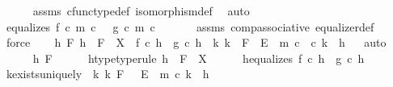 \begin{isabellebody}
\ \ \ \ \isamarkupfalse%
\ assms{\isacharparenleft}{\kern0pt}{}{\isacharcomma}{\kern0pt}{}{\isacharparenright}{\kern0pt}\ cfunc{\isacharunderscore}{\kern0pt}type{\isacharunderscore}{\kern0pt}def\ isomorphism{\isacharunderscore}{\kern0pt}def\ \isamarkupfalse%
\ auto\isanewline
\isanewline
\ \ \isamarkupfalse%
\ equalizes{\isacharcolon}{\kern0pt}\ {\isachardoublequoteopen}f\ {\isasymcirc}\isactrlsub c\ m\ {\isasymcirc}\isactrlsub c\ {\isasymphi}\ {\isacharequal}{\kern0pt}\ g\ {\isasymcirc}\isactrlsub c\ m\ {\isasymcirc}\isactrlsub c\ {\isasymphi}{\isachardoublequoteclose}\isanewline
\ \ \ \ \isamarkupfalse%
\ assms\ comp{\isacharunderscore}{\kern0pt}associative{}\ equalizer{\isacharunderscore}{\kern0pt}def\ \isamarkupfalse%
\ force\isanewline
\ \ \isamarkupfalse%
\ {\isachardoublequoteopen}{\isasymforall}h\ F{\isachardot}{\kern0pt}\ h\ {\isacharcolon}{\kern0pt}\ F\ {\isasymrightarrow}\ X\ {\isasymand}\ f\ {\isasymcirc}\isactrlsub c\ h\ {\isacharequal}{\kern0pt}\ g\ {\isasymcirc}\isactrlsub c\ h\ {\isasymlongrightarrow}\ {\isacharparenleft}{\kern0pt}{\isasymexists}{\isacharbang}{\kern0pt}k{\isachardot}{\kern0pt}\ k\ {\isacharcolon}{\kern0pt}\ F\ {\isasymrightarrow}\ E{\isacharprime}{\kern0pt}\ {\isasymand}\ {\isacharparenleft}{\kern0pt}m\ {\isasymcirc}\isactrlsub c\ {\isasymphi}{\isacharparenright}{\kern0pt}\ {\isasymcirc}\isactrlsub c\ k\ {\isacharequal}{\kern0pt}\ h{\isacharparenright}{\kern0pt}{\isachardoublequoteclose}\isanewline
\ \ \isamarkupfalse%
{\isacharparenleft}{\kern0pt}auto{\isacharparenright}{\kern0pt}\isanewline
\ \ \ \ \isamarkupfalse%
\ h\ F\isanewline
\ \ \ \ \isamarkupfalse%
\ h{\isacharunderscore}{\kern0pt}type{\isacharbrackleft}{\kern0pt}type{\isacharunderscore}{\kern0pt}rule{\isacharbrackright}{\kern0pt}{\isacharcolon}{\kern0pt}\ {\isachardoublequoteopen}h\ {\isacharcolon}{\kern0pt}\ F\ {\isasymrightarrow}\ X{\isachardoublequoteclose}\isanewline
\ \ \ \ \isamarkupfalse%
\ h{\isacharunderscore}{\kern0pt}equalizes{\isacharcolon}{\kern0pt}\ {\isachardoublequoteopen}f\ {\isasymcirc}\isactrlsub c\ h\ {\isacharequal}{\kern0pt}\ g\ {\isasymcirc}\isactrlsub c\ h{\isachardoublequoteclose}\isanewline
\ \ \ \ \isamarkupfalse%
\ k{\isacharunderscore}{\kern0pt}exists{\isacharunderscore}{\kern0pt}uniquely{\isacharcolon}{\kern0pt}\ {\isachardoublequoteopen}{\isasymexists}{\isacharbang}{\kern0pt}\ k{\isachardot}{\kern0pt}\ k{\isacharcolon}{\kern0pt}\ F\ \ {\isasymrightarrow}\ E\ {\isasymand}\ m\ {\isasymcirc}\isactrlsub c\ k\ {\isacharequal}{\kern0pt}\ h{\isachardoublequoteclose}\isanewline

\end{isabellebody}

